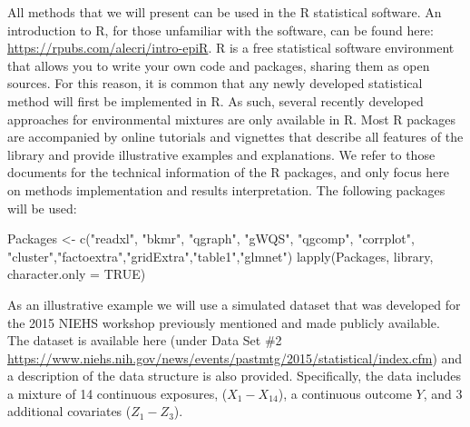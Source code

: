 \documentclass[
]{book}
\newenvironment{Shaded}{\begin{snugshade}}{\end{snugshade}}
\newcommand{\AttributeTok}[1]{\textcolor[rgb]{0.77,0.63,0.00}{#1}}
\newcommand{\ConstantTok}[1]{\textcolor[rgb]{0.00,0.00,0.00}{#1}}
\newcommand{\FunctionTok}[1]{\textcolor[rgb]{0.00,0.00,0.00}{#1}}
\newcommand{\NormalTok}[1]{#1}
\newcommand{\OtherTok}[1]{\textcolor[rgb]{0.56,0.35,0.01}{#1}}
\newcommand{\StringTok}[1]{\textcolor[rgb]{0.31,0.60,0.02}{#1}}
\begin{document}
All methods that we will present can be used in the R statistical software. An introduction to R, for those unfamiliar with the software, can be found here: \url{https://rpubs.com/alecri/intro-epiR}. R is a free statistical software environment that allows you to write your own code and packages, sharing them as open sources. For this reason, it is common that any newly developed statistical method will first be implemented in R. As such, several recently developed approaches for environmental mixtures are only available in R. Most R packages are accompanied by online tutorials and vignettes that describe all features of the library and provide illustrative examples and explanations. We refer to those documents for the technical information of the R packages, and only focus here on methods implementation and results interpretation. The following packages will be used:

\begin{Shaded}
\begin{Highlighting}[]
\NormalTok{Packages }\OtherTok{\textless{}{-}} \FunctionTok{c}\NormalTok{(}\StringTok{"readxl"}\NormalTok{, }\StringTok{"bkmr"}\NormalTok{, }\StringTok{"qgraph"}\NormalTok{, }\StringTok{"gWQS"}\NormalTok{, }\StringTok{"qgcomp"}\NormalTok{, }\StringTok{"corrplot"}\NormalTok{, }\StringTok{"cluster"}\NormalTok{,}\StringTok{"factoextra"}\NormalTok{,}\StringTok{"gridExtra"}\NormalTok{,}\StringTok{"table1"}\NormalTok{,}\StringTok{"glmnet"}\NormalTok{)}
\FunctionTok{lapply}\NormalTok{(Packages, library, }\AttributeTok{character.only =} \ConstantTok{TRUE}\NormalTok{)}
\end{Highlighting}
\end{Shaded}

As an illustrative example we will use a simulated dataset that was developed for the 2015 NIEHS workshop previously mentioned and made publicly available. The dataset is available here (under Data Set \#2 \url{https://www.niehs.nih.gov/news/events/pastmtg/2015/statistical/index.cfm}) and a description of the data structure is also provided. Specifically, the data includes a mixture of 14 continuous exposures, (\(X_1-X_{14}\)), a continuous outcome \(Y\), and 3 additional covariates (\(Z_1-Z_3\)).
\end{document}
